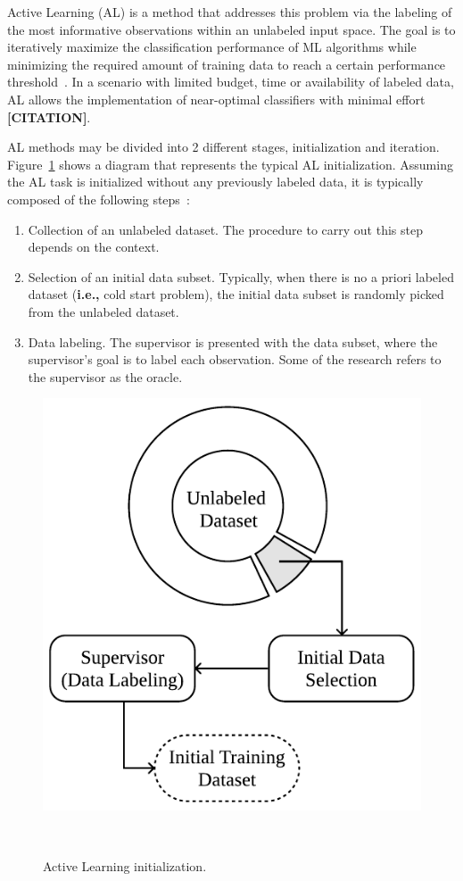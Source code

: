 \documentclass[parskip=full]{scrartcl}
\begin{document}
Active Learning (AL) is a method that addresses this problem via the labeling
of the most informative observations within an unlabeled input space. The goal
is to iteratively maximize the classification performance of ML algorithms
while minimizing the required amount of training data to reach a certain
performance threshold~\cite{Shrivastava2021}. In a scenario with limited
budget, time or availability of labeled data, AL allows the implementation of
near-optimal classifiers with minimal effort \textbf{[CITATION]}.

AL methods may be divided into 2 different stages, initialization and
iteration. Figure~\ref{fig:al_initialization} shows a diagram that represents
the typical AL initialization. Assuming the AL task is initialized without any
previously labeled data, it is typically composed of the following
steps~\cite{Fonseca2021}:

\begin{enumerate}

    \item Collection of an unlabeled dataset. The procedure to carry out
        this step depends on the context.

    \item Selection of an initial data subset. Typically, when there is no a
        priori labeled dataset (\textbf{i.e.,} cold start problem), the
        initial data subset is randomly picked from the unlabeled dataset.

    \item Data labeling. The supervisor is presented with the data
        subset, where the supervisor's goal is to label each observation. Some
        of the research refers to the supervisor as the oracle.

\end{enumerate}

\begin{figure}[H]
	\centering
	\includegraphics[width=.4\linewidth]{../analysis/al_initialization}
    \caption{%
        Active Learning initialization.
    }~\label{fig:al_initialization}
\end{figure}
\end{document}
